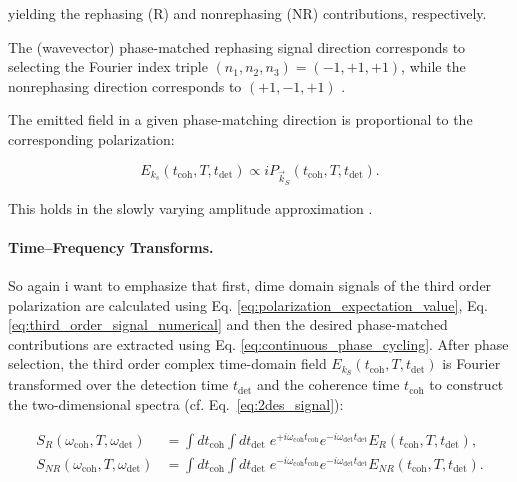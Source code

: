 \noindent 
yielding the rephasing (R) and nonrephasing (NR) contributions, respectively.

\noindent 
The (wavevector) phase-matched rephasing signal direction corresponds to selecting the Fourier index triple $(n_1,n_2,n_3)=(-1,+1,+1)$, while the nonrephasing direction corresponds to $(+1,-1,+1)$ \cite{mukamel1995principlesnonlinearoptical, cho2009twodimensionalopticalspectroscopy, greenetal2024vibrationalcoherenceshalfbroadband}.

\noindent 
The emitted field in a given phase-matching direction is proportional to the corresponding polarization\cite{jonas2003twodimensionalfemtosecondspectroscopy}:

\begin{equation}
	E_{k_s}(t_{\text{coh}},T,t_{\text{det}}) \propto i P_{\vec{k}_S}(t_{\text{coh}},T,t_{\text{det}}).
	\label{eq:field_polarization_relation}
\end{equation}

This holds in the slowly varying amplitude approximation \cite{mukamel1995principlesnonlinearoptical}.


\paragraph{Time--Frequency Transforms.}

\noindent 
So again i want to emphasize that first, dime domain signals of the third order polarization are calculated using Eq. \eqref{eq:polarization_expectation_value}, Eq. \eqref{eq:third_order_signal_numerical} and then the desired phase-matched contributions are extracted using Eq. \eqref{eq:continuous_phase_cycling}. 
After phase selection, the third order complex time-domain field $E_{k_S}(t_{\text{coh}}, T, t_{\text{det}})$ is Fourier transformed over the detection time $t_{\text{det}}$ and the coherence time $t_{\text{coh}}$ to construct the two-dimensional spectra (cf. Eq.~\eqref{eq:2des_signal}):

\begin{align}
	S_{R}(\omega_{\text{coh}}, T, \omega_{\text{det}})
	 & =
	\int dt_{\text{coh}} \int dt_{\text{det}} \;
	e^{+ i \omega_{\text{coh}} t_{\text{coh}}} e^{- i \omega_{\text{det}} t_{\text{det}}}
	E_{R}(t_{\text{coh}}, T, t_{\text{det}}),
	\label{eq:rephasing_transform} \\
	S_{NR}(\omega_{\text{coh}}, T, \omega_{\text{det}})
	 & =
	\int dt_{\text{coh}} \int dt_{\text{det}} \;
	e^{- i \omega_{\text{coh}} t_{\text{coh}}} e^{- i \omega_{\text{det}} t_{\text{det}}}
	E_{NR}(t_{\text{coh}}, T, t_{\text{det}}).
	\label{eq:nonrephasing_transform}
\end{align}

